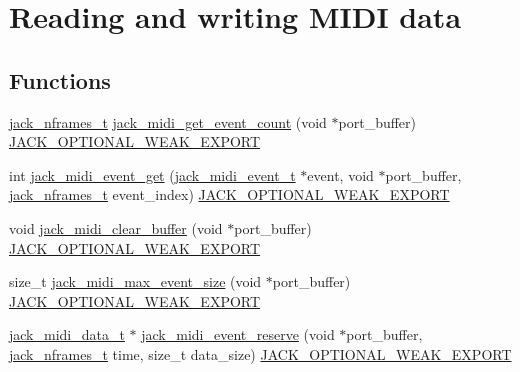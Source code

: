 \hypertarget{group__MIDIAPI}{\section{\-Reading and writing \-M\-I\-D\-I data}
\label{d1/d91/group__MIDIAPI}
}
\subsection*{\-Functions}
\begin{DoxyCompactItemize}
\item 
\hyperlink{types_8h_aa954df532e901ae5172e68a23f3da9b6}{jack\-\_\-nframes\-\_\-t} \hyperlink{group__MIDIAPI_ga0a87111085b94460401b0b688595a138}{jack\-\_\-midi\-\_\-get\-\_\-event\-\_\-count} (void $\ast$port\-\_\-buffer) \hyperlink{weakmacros_8h_adf1bde0dd996bbf61a44311165014dd1}{\-J\-A\-C\-K\-\_\-\-O\-P\-T\-I\-O\-N\-A\-L\-\_\-\-W\-E\-A\-K\-\_\-\-E\-X\-P\-O\-R\-T}
\item 
int \hyperlink{group__MIDIAPI_ga95120a9e8cbd41bbce6d4479cfcab8fd}{jack\-\_\-midi\-\_\-event\-\_\-get} (\hyperlink{midiport_8h_a2e564e80b61dd77ec3de99b8b9ab259e}{jack\-\_\-midi\-\_\-event\-\_\-t} $\ast$event, void $\ast$port\-\_\-buffer, \hyperlink{types_8h_aa954df532e901ae5172e68a23f3da9b6}{jack\-\_\-nframes\-\_\-t} event\-\_\-index) \hyperlink{weakmacros_8h_adf1bde0dd996bbf61a44311165014dd1}{\-J\-A\-C\-K\-\_\-\-O\-P\-T\-I\-O\-N\-A\-L\-\_\-\-W\-E\-A\-K\-\_\-\-E\-X\-P\-O\-R\-T}
\item 
void \hyperlink{group__MIDIAPI_ga7635c6e0a4eb2314a5fb5a058c278078}{jack\-\_\-midi\-\_\-clear\-\_\-buffer} (void $\ast$port\-\_\-buffer) \hyperlink{weakmacros_8h_adf1bde0dd996bbf61a44311165014dd1}{\-J\-A\-C\-K\-\_\-\-O\-P\-T\-I\-O\-N\-A\-L\-\_\-\-W\-E\-A\-K\-\_\-\-E\-X\-P\-O\-R\-T}
\item 
size\-\_\-t \hyperlink{group__MIDIAPI_gab69743a191f150757fa3708eae8fdb81}{jack\-\_\-midi\-\_\-max\-\_\-event\-\_\-size} (void $\ast$port\-\_\-buffer) \hyperlink{weakmacros_8h_adf1bde0dd996bbf61a44311165014dd1}{\-J\-A\-C\-K\-\_\-\-O\-P\-T\-I\-O\-N\-A\-L\-\_\-\-W\-E\-A\-K\-\_\-\-E\-X\-P\-O\-R\-T}
\item 
\hyperlink{midiport_8h_ad1df9c73b07584ffb69c276421ff55c9}{jack\-\_\-midi\-\_\-data\-\_\-t} $\ast$ \hyperlink{group__MIDIAPI_ga150dcdc37583e1ecbe0a6f16b6ac48a9}{jack\-\_\-midi\-\_\-event\-\_\-reserve} (void $\ast$port\-\_\-buffer, \hyperlink{types_8h_aa954df532e901ae5172e68a23f3da9b6}{jack\-\_\-nframes\-\_\-t} time, size\-\_\-t data\-\_\-size) \hyperlink{weakmacros_8h_adf1bde0dd996bbf61a44311165014dd1}{\-J\-A\-C\-K\-\_\-\-O\-P\-T\-I\-O\-N\-A\-L\-\_\-\-W\-E\-A\-K\-\_\-\-E\-X\-P\-O\-R\-T}

\end{DoxyCompactItemize}
